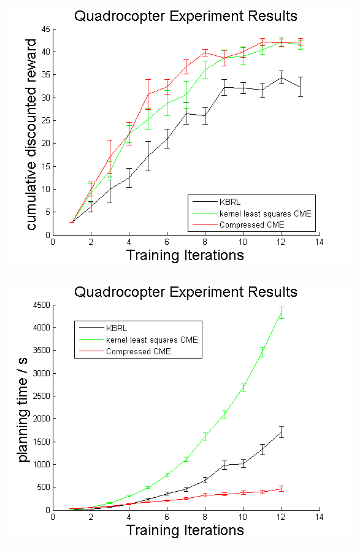 \documentclass[letterpaper]{article}
\begin{document}
\begin{figure}[htb]
\centering
\begin{subfigure}[b]{0.3\textwidth}
\includegraphics[width=\textwidth]{Quadrewards.png}
\end{subfigure}
\begin{subfigure}[b]{0.3\textwidth}
\includegraphics[width=\textwidth]{Quadplanning.png}
\end{subfigure}
\begin{subfigure}[b]{0.3\textwidth}

\end{subfigure}
\end{figure}
\end{document}
